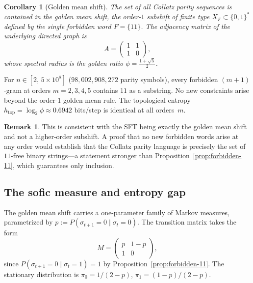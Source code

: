 \documentclass[11pt,a4paper]{article}
\theoremstyle{plain}
\newtheorem{corollary}[theorem]{Corollary}
\theoremstyle{definition}
\newtheorem{remark}[theorem]{Remark}
\begin{document}
\begin{corollary}[Golden mean shift]\label{cor:golden-mean}
    The set of all Collatz parity sequences is contained in the
    \emph{golden mean shift}, the order-$1$ subshift of finite type
    $X_F \subset \{0,1\}^*$ defined by the single forbidden word
    $F = \{11\}$.  The adjacency matrix of the underlying directed
    graph is
    \begin{equation}\label{eq:adjacency}
        A = \begin{pmatrix} 1 & 1 \\ 1 & 0 \end{pmatrix},
    \end{equation}
    whose spectral radius is the golden ratio
    $\phi = \tfrac{1 + \sqrt{5}}{2}$.
\end{corollary}

\begin{empirical}
\label{obs:no-higher}
    For $n \in [2,\, 5 \times 10^8]$ ($98{,}002{,}908{,}272$ parity
    symbols), every forbidden $(m{+}1)$-gram at orders
    $m = 2, 3, 4, 5$ contains $11$ as a substring.  No new
    constraints arise beyond the order-$1$ golden mean rule.
    The topological entropy
    $h_{\mathrm{top}} = \log_2 \phi \approx 0.6942$ bits/step is
    identical at all orders~$m$.
\end{empirical}

\begin{remark}
    This is consistent with the SFT being exactly the golden mean
    shift and not a higher-order subshift.  A proof that no new
    forbidden words arise at any order would establish that the
    Collatz parity language is precisely the set of $11$-free binary
    strings---a statement stronger than
    Proposition~\ref{prop:forbidden-11}, which guarantees only
    inclusion.
\end{remark}

\subsection{The sofic measure and entropy gap}

The golden mean shift carries a one-parameter family of Markov
measures, parametrized by $p := P(\sigma_{t+1} = 0 \mid \sigma_t =
0)$.  The transition matrix takes the form
\begin{equation}\label{eq:parity-transition}
    M = \begin{pmatrix} p & 1 - p \\ 1 & 0 \end{pmatrix},
\end{equation}
since $P(\sigma_{t+1} = 0 \mid \sigma_t = 1) = 1$ by
Proposition~\ref{prop:forbidden-11}.  The stationary distribution is
$\pi_0 = 1/(2-p)$, $\pi_1 = (1-p)/(2-p)$.
\end{document}
